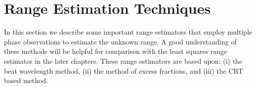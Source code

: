 \section{Range Estimation Techniques}\label{sec:ch2-range-estimation-techniques}
In this section we describe some important range estimators that employ multiple phase observations to estimate the unknown range.  A good understanding of these methods will be helpful for comparison with the least squares range estimator in the later chapters. These range estimators are based upon: (i) the beat wavelength method, (ii) the method of excess fractions, and (iii) the CRT based method. %
